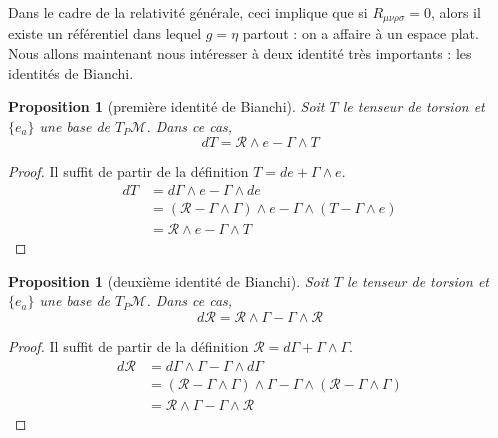 \documentclass[a4paper,11pt]{report}
\theoremstyle{definition}
\theoremstyle{plain}
\newtheorem{prop}[thm]{Proposition}
\theoremstyle{definition}
\theoremstyle{remark}
\newcommand{\M}{\mathscr{M}}
\begin{document}
                Dans le cadre de la relativité générale, ceci implique que si $R_{\mu\nu\rho\sigma} = 0$, alors il existe un référentiel dans lequel $g = \eta$ partout : on a affaire à un espace plat.\\
            
                Nous allons maintenant nous intéresser à deux identité très importants : les identités de Bianchi.
                
                \begin{prop}[première identité de Bianchi]
                    Soit $T$ le tenseur de torsion et $\{e_a\}$ une base de $T_P\M$. Dans ce cas,
                    \begin{equation}
                        dT = \mathscr{R} \wedge e - \Gamma\wedge T
                    \end{equation}
                \end{prop}
                
                \begin{proof}
                    Il suffit de partir de la définition $T = de+\Gamma\wedge e$.
                    \begin{align}
                        dT &= d\Gamma\wedge e - \Gamma \wedge de\\
                        &= (\mathscr{R}-\Gamma\wedge\Gamma)\wedge e-\Gamma\wedge(T-\Gamma\wedge e)\\
                        &= \mathscr{R} \wedge e - \Gamma\wedge T
                    \end{align}
                \end{proof}
                
                \begin{prop}[deuxième identité de Bianchi]
                    Soit $T$ le tenseur de torsion et $\{e_a\}$ une base de $T_P\M$. Dans ce cas,
                    \begin{equation}
                        d\mathscr{R} = \mathscr{R} \wedge \Gamma - \Gamma\wedge \mathscr{R}
                    \end{equation}
                \end{prop}
                
                \begin{proof}
                    Il suffit de partir de la définition $\mathscr{R} = d\Gamma+\Gamma\wedge\Gamma$.
                    \begin{align}
                        d\mathscr{R} &= d\Gamma\wedge\Gamma-\Gamma\wedge d\Gamma\\
                        &= (\mathscr{R}-\Gamma\wedge\Gamma)\wedge\Gamma - \Gamma\wedge(\mathscr{R}-\Gamma\wedge\Gamma)\\
                        &= \mathscr{R} \wedge \Gamma - \Gamma\wedge \mathscr{R}
                    \end{align}
                \end{proof}
                
\end{document}
